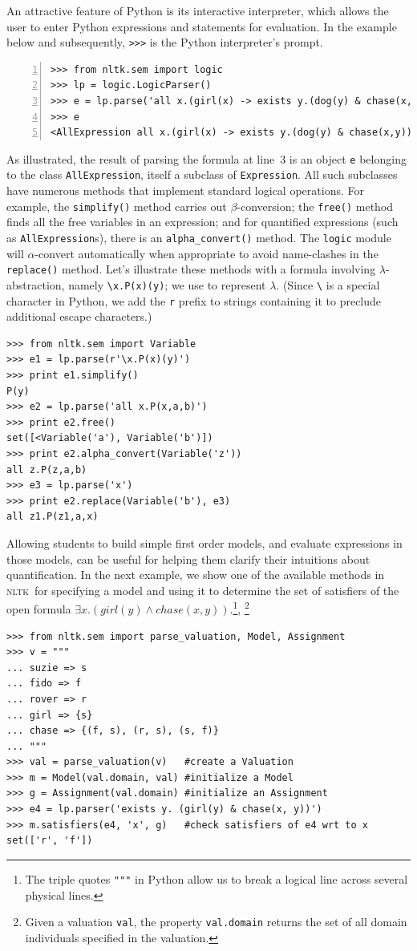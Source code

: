 \documentclass[11pt, a4paper]{article}
\newcommand{\NLTK}{\textsc{nltk}}
\begin{document}
An attractive feature of Python is its interactive interpreter,
which allows the user to enter Python expressions and statements for
evaluation. In the example below and subsequently, \verb!>>>! is the
Python interpreter's prompt. 
\begin{Verbatim}[numbers=left]
>>> from nltk.sem import logic
>>> lp = logic.LogicParser()
>>> e = lp.parse('all x.(girl(x) -> exists y.(dog(y) & chase(x,y)))')
>>> e
<AllExpression all x.(girl(x) -> exists y.(dog(y) & chase(x,y)))>
\end{Verbatim}
As illustrated, the result of parsing the formula at line~3 is an object
\texttt{e} belonging to the class \texttt{AllExpression}, itself a
subclass of \texttt{Expression}.  All such subclasses have numerous
methods that implement standard logical operations. For
example, the \texttt{simplify()} method carries out
$\beta$-conversion; the \texttt{free()} method finds
all the free variables in an expression; and for quantified expressions
(such as \texttt{AllExpression}s), there is an \texttt{alpha\_convert()}
method.  The \texttt{logic}
module will $\alpha$-convert automatically when appropriate to
avoid name-clashes in the \texttt{replace()} method. Let's illustrate
these methods
with a formula involving $\lambda$-abstraction, namely
\verb!\x.P(x)(y)!; we use \protect{\verb!\!} to represent
$\lambda$. (Since \verb!\! is a special character in Python,
we add the \texttt{r} prefix to strings containing it to preclude
additional escape characters.)
\begin{Verbatim}
>>> from nltk.sem import Variable
>>> e1 = lp.parse(r'\x.P(x)(y)')
>>> print e1.simplify()
P(y)
>>> e2 = lp.parse('all x.P(x,a,b)')
>>> print e2.free()
set([<Variable('a'), Variable('b')])
>>> print e2.alpha_convert(Variable('z'))
all z.P(z,a,b)
>>> e3 = lp.parse('x')
>>> print e2.replace(Variable('b'), e3)
all z1.P(z1,a,x)
\end{Verbatim}
Allowing students to build simple first order models, and evaluate
expressions in those models, can be useful for helping them clarify
their intuitions about quantification. In the next example, we show
one of the available methods in \NLTK\ for specifying a model and
using it to determine the set of satisfiers of the open formula
$\exists x.(\mathit{girl}(y) \wedge
\mathit{chase}(x,y))$.\footnote{The triple quotes \texttt{"""} in
  Python allow us to break a logical line across several physical
  lines.},
\footnote{Given a valuation \texttt{val}, the property
  \texttt{val.domain} returns the set of all domain individuals
  specified in the valuation.}
\begin{Verbatim}
>>> from nltk.sem import parse_valuation, Model, Assignment
>>> v = """
... suzie => s
... fido => f
... rover => r
... girl => {s}
... chase => {(f, s), (r, s), (s, f)}
... """
>>> val = parse_valuation(v)   #create a Valuation
>>> m = Model(val.domain, val) #initialize a Model
>>> g = Assignment(val.domain) #initialize an Assignment
>>> e4 = lp.parser('exists y. (girl(y) & chase(x, y))')
>>> m.satisfiers(e4, 'x', g)   #check satisfiers of e4 wrt to x
set(['r', 'f'])
\end{Verbatim}
\end{document}
